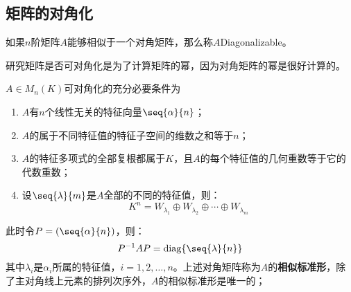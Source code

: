 \subsection{矩阵的对角化}
\begin{definition}
	如果$n$阶矩阵$A$能够相似于一个对角矩阵，那么称$A$\gls{Diagonalizable}。
\end{definition}
研究矩阵是否可对角化是为了计算矩阵的幂，因为对角矩阵的幂是很好计算的。
\begin{theorem}\label{theo:DiagCondition}
	$A\in M_{n}(K)$可对角化的充分必要条件为
	\begin{enumerate}
		\item $A$有$n$个线性无关的特征向量$\seq{\alpha}{n}$；
		\item $A$的属于不同特征值的特征子空间的维数之和等于$n$；
		\item $A$的特征多项式的全部复根都属于$K$，且$A$的每个特征值的几何重数等于它的代数重数；
		\item 设$\seq{\lambda}{m}$是$A$全部的不同的特征值，则：
		\begin{equation*}
			K^n=W_{\lambda_1}\oplus W_{\lambda_2}\oplus\cdots\oplus W_{\lambda_m}
		\end{equation*}
	\end{enumerate}
	此时令$P=(\seq{\alpha}{n})$，则：
	\begin{equation*}
		P^{-1}AP=\operatorname{diag}\{\seq{\lambda}{n}\}
	\end{equation*}
	其中$\lambda_i$是$\alpha_i$所属的特征值，$i=1,2,\dots,n$。上述对角矩阵称为$A$的\textbf{相似标准形}，除了主对角线上元素的排列次序外，$A$的相似标准形是唯一的；
\end{theorem}
